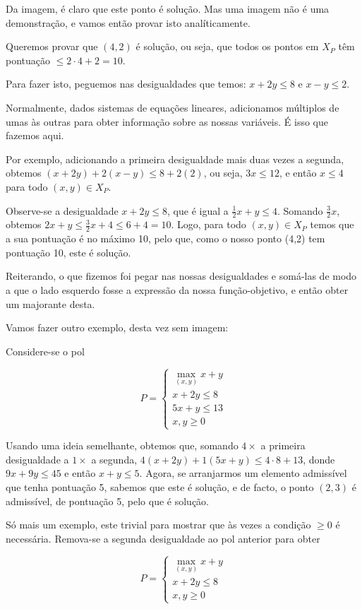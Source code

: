 \documentclass{article}
\theoremstyle{definition}
\begin{document}
	Da imagem, é claro que este ponto é solução. Mas uma imagem não é uma demonstração, e vamos então provar isto analíticamente.
	
	Queremos provar que $(4,2)$ é solução, ou seja, que todos os pontos em $X_P$ têm pontuação $\leq 2 \cdot 4 + 2 = 10$.
	
	Para fazer isto, peguemos nas desigualdades que temos: $x + 2y \leq 8$ e $x - y \leq 2$.
	
	Normalmente, dados sistemas de equações lineares, adicionamos múltiplos de umas às outras para obter informação sobre as nossas variáveis. É isso que fazemos aqui.
	
	Por exemplo, adicionando a primeira desigualdade mais duas vezes a segunda, obtemos $(x+2y) + 2(x-y) \leq 8 + 2(2)$, ou seja, $3x \leq 12$, e então $x \leq 4$ para todo $(x,y) \in X_P$.
	
	Observe-se a desigualdade $x + 2y \leq 8$, que é igual a $\frac 1 2 x + y \leq 4$. Somando $\frac 3 2 x$, obtemos $2x + y \leq \frac 3 2 x + 4 \leq 6 + 4 = 10$. Logo, para todo $(x,y) \in X_P$ temos que a sua pontuação é no máximo 10, pelo que, como o nosso ponto (4,2) tem pontuação 10, este é solução.
	
	Reiterando, o que fizemos foi pegar nas nossas desigualdades e somá-las de modo a que o lado esquerdo fosse a expressão da nossa função-objetivo, e então obter um majorante desta.
	
	Vamos fazer outro exemplo, desta vez sem imagem:
	
	Considere-se o pol
	
	\[
	P =
	\begin{cases}
	\max\limits_{(x,y)} x + y\\
	x + 2y \leq 8\\
	5x + y \leq 13 \\
	x, y \geq 0
	\end{cases}
	\]
	
	Usando uma ideia semelhante, obtemos que, somando $4 \times$ a primeira desigualdade a $1 \times$ a segunda, $4(x + 2y) + 1(5x + y) \leq 4 \cdot 8 + 13$, donde $9x + 9y \leq 45$ e então $x+y \leq 5$. Agora, se arranjarmos um elemento admissível que tenha pontuação 5, sabemos que este é solução, e de facto, o ponto $(2, 3)$ é admissível, de pontuação 5, pelo que é solução.
	
	Só mais um exemplo, este trivial para mostrar que às vezes a condição $\geq 0$ é necessária. Remova-se a segunda desigualdade ao pol anterior para obter
	
	\[
	P =
	\begin{cases}
	\max\limits_{(x,y)} x + y\\
	x + 2y \leq 8\\
	x, y \geq 0
	\end{cases}
	\]
	
\end{document}
